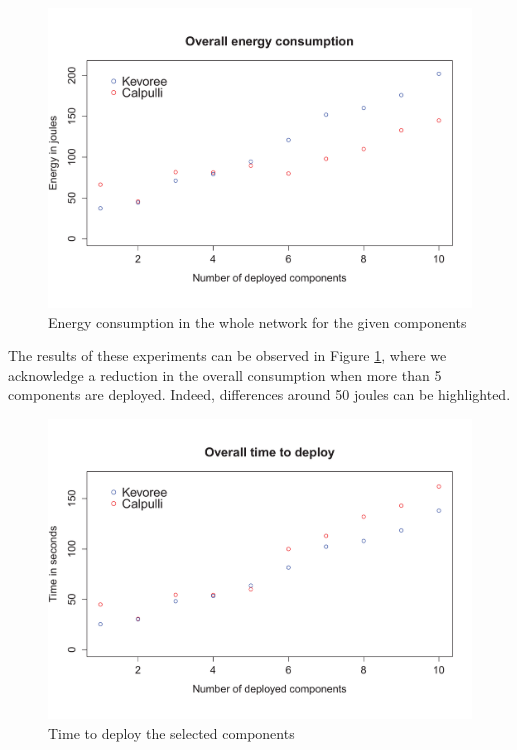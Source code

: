 \begin{figure}[htb]
	\centering
	\includegraphics[width=0.95\columnwidth]{chapters/inter-node.images/energyWithFonts.pdf}
	\caption{Energy consumption in the whole network for the given components} \label{fig:Energy}
\end{figure}

The results of these experiments can be observed in Figure \ref{fig:Energy}, where we acknowledge a reduction in the overall consumption when more than 5 components are deployed.
Indeed, differences around 50 joules can be highlighted. 

\begin{figure}[htb]
	\centering
	\includegraphics[width=0.95\columnwidth]{chapters/inter-node.images/timeWithFonts.pdf}
	\caption{Time to deploy the selected components} \label{fig:Time}
\end{figure}

